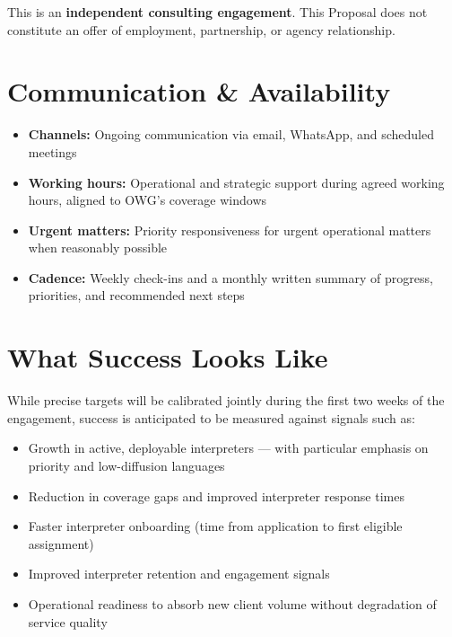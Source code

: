 \documentclass{proposal}
\begin{document}
\begin{clausebox}
\sffamily\small
This is an \textbf{independent consulting engagement}. This Proposal does not
constitute an offer of employment, partnership, or agency relationship.
\end{clausebox}

\section{Communication \& Availability}

\begin{itemize}[leftmargin=1.5em, itemsep=4pt, topsep=4pt]
  \item \textbf{Channels:} Ongoing communication via email, WhatsApp, and
        scheduled meetings
  \item \textbf{Working hours:} Operational and strategic support during
        agreed working hours, aligned to OWG's coverage windows
  \item \textbf{Urgent matters:} Priority responsiveness for urgent
        operational matters when reasonably possible
  \item \textbf{Cadence:} Weekly check-ins and a monthly written summary
        of progress, priorities, and recommended next steps
\end{itemize}

\section{What Success Looks Like}

While precise targets will be calibrated jointly during the first two weeks
of the engagement, success is anticipated to be measured against signals
such as:

\begin{itemize}[leftmargin=1.5em, itemsep=3pt, topsep=2pt]
  \item Growth in active, deployable interpreters --- with particular
        emphasis on priority and low-diffusion languages
  \item Reduction in coverage gaps and improved interpreter response times
  \item Faster interpreter onboarding (time from application to first
        eligible assignment)
  \item Improved interpreter retention and engagement signals
  \item Operational readiness to absorb new client volume without
        degradation of service quality
\end{itemize}
\end{document}
